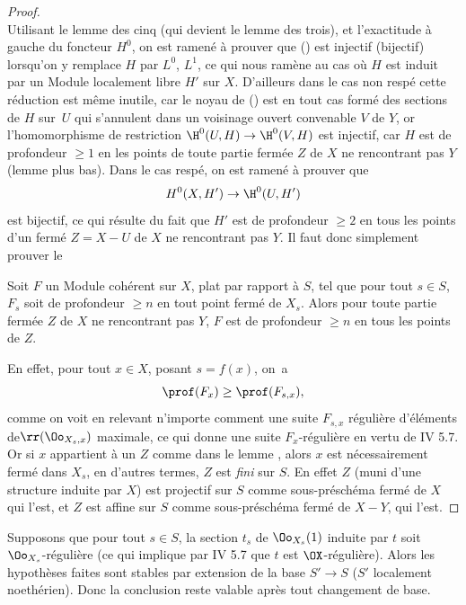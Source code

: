 \begin{proof}
\[\]
Utilisant le lemme des cinq (qui devient le lemme des trois), et l'exactitude \`a gauche du foncteur $H^0$, on est ramen\'e \`a prouver que () est injectif (\resp bijectif) lorsqu'on y remplace $H$ par $L^0$, $L^1$, ce qui nous ram\`ene au cas o\`u $H$ est induit par un Module localement libre $H'$ sur $X$. D'ailleurs dans le cas non resp\'e cette r\'eduction est m\^eme inutile, car le noyau de () est en tout cas form\'e des sections de $H$ sur~$U$ qui s'annulent dans un voisinage ouvert convenable $V$ de $Y$, or l'homomorphisme de restriction $\H^0(U, H)\to\H^0(V, H)$ est injectif, car $H$ est de profondeur $\geq 1$ en les points de toute partie ferm\'ee $Z$ de $X$ ne rencontrant pas $Y$ (\cf lemme plus bas). Dans le cas resp\'e, on est ramen\'e \`a prouver que
\[
H^0(X, H')\to\H^0(U, H')
\]
est bijectif, ce qui r\'esulte du fait que $H'$ est de profondeur $\geq 2$ en tous les points d'un ferm\'e $Z=X- U$ de $X$ ne rencontrant pas $Y$. Il faut donc simplement prouver le

\begin{lemme} \label{XII.2.5} Soit $F$ un Module coh\'erent sur $X$, plat par rapport \`a $S$, tel que pour tout $s\in S$, $F_s$ soit de profondeur $\geq n$ en tout point ferm\'e de $X_s$. Alors pour toute partie ferm\'ee $Z$ de $X$ ne rencontrant pas $Y$, $F$ est de profondeur $\geq n$ en tous les points de $Z$.
\end{lemme}

En effet, pour tout $x\in X$, posant $s=f(x)$, on~a
\steco
\begin{equation} \label{eq:XII.16} {}\prof(F_x)\geq \prof(F_{s, x}),
\end{equation}
comme on voit en relevant n'importe comment une suite $F_{s, x}$ r\'eguli\`ere d'\'el\'ements de\pageoriginale $\rr(\Oo_{X_s, x})$ maximale, ce qui donne une suite $F_x$-r\'eguli\`ere en vertu de  IV 5.7. Or si $x$ appartient \`a un $Z$ comme dans le lemme , alors $x$ est n\'ecessairement ferm\'e dans $X_s$, en d'autres termes, $Z$ est \emph{fini} sur $S$. En effet $Z$ (muni d'une structure induite par $X$) est projectif sur $S$ comme sous-pr\'esch\'ema ferm\'e de $X$ qui l'est, et $Z$ est affine sur $S$ comme sous-pr\'esch\'ema ferm\'e de $X- Y$, qui l'est.
\skipqed
\end{proof}

\begin{remarque} \label{XII.2.6}
Supposons que pour tout $s\in S$, la section $t_s$ de $\Oo_{X_s}(1)$ induite par $t$ soit $\Oo_{X_s}$-r\'eguli\`ere (ce qui implique par  IV 5.7 que $t$ est $\OX$-r\'eguli\`ere). Alors les hypoth\`eses faites sont stables par extension de la base $S'\to S$ ($S'$ localement noeth\'erien). Donc la conclusion reste valable apr\`es tout changement de base.
\end{remarque}

